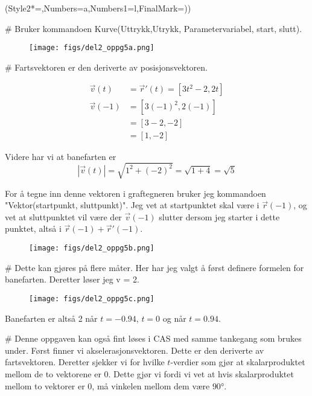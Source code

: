 \begin{easylist}[enumerate]
	\ListProperties(Style2*=,Numbers=a,Numbers1=l,FinalMark={)})
	
	# Bruker kommandoen Kurve(Uttrykk,Utrykk, Parametervariabel, start, slutt).
	\begin{figure}[ht!]
		\centering
		\texttt{[image: figs/del2\_oppg5a.png]}
	\end{figure}
	
	# Fartsvektoren er den deriverte av posisjonsvektoren.
	
	\begin{equation*}
		\begin{aligned}
			\vec{v}(t) & = \vec{r}'(t)  = [3t^2 -2, 2t] \\
			\vec{v}(-1) & = [3(-1)^2,2(-1)] \\
			& = [3-2,-2] \\
			& = [1,-2] 
		\end{aligned}
	\end{equation*}
	
	Videre har vi at banefarten er $$|\vec{v}(t)| = \sqrt{1^2 + (-2)^2} = \sqrt{1 + 4} = \sqrt{5}$$
	
	For å tegne inn denne vektoren i graftegneren bruker jeg kommandoen "Vektor(startpunkt, sluttpunkt)". Jeg vet at startpunktet skal være i $\vec{r}(-1)$, og vet at sluttpunktet vil være der $\vec{v}(-1)$ slutter dersom jeg starter i dette punktet, altså i $\vec{r}(-1) + \vec{r}'(-1)$.

	\begin{figure}[ht!]
		\centering
		\texttt{[image: figs/del2\_oppg5b.png]}
	\end{figure}
	
	\newpage
	# Dette kan gjøres på flere måter. Her har jeg valgt å først definere formelen for banefarten. Deretter løser jeg v = 2. 
		\begin{figure}[ht!]
			\centering
			\texttt{[image: figs/del2\_oppg5c.png]}
		\end{figure}
		
	Banefarten er altså 2 når $t = -0.94$, $t=0$ og når $t = 0.94$.
		
		# Denne oppgaven kan også fint løses i CAS med samme tankegang som brukes under. Først finner vi akselerasjonsvektoren. Dette er den deriverte av fartsvektoren. Deretter sjekker vi for hvilke $t$-verdier som gjør at skalarproduktet mellom de to vektorene er 0. Dette gjør vi fordi vi vet at hvis skalarproduktet mellom to vektorer er 0, må vinkelen mellom dem være $\ang{90}$. 
		

\end{easylist}
